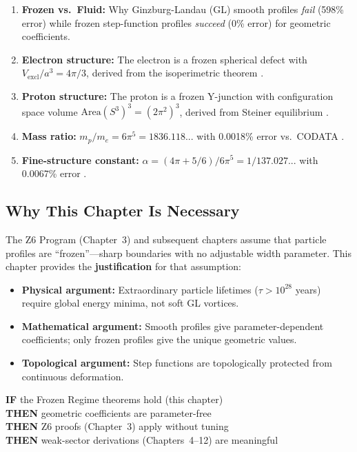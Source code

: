 \begin{enumerate}
    \item \textbf{Frozen vs.\ Fluid:} Why Ginzburg-Landau (GL) smooth profiles \emph{fail} (598\% error)
          while frozen step-function profiles \emph{succeed} (0\% error) for geometric coefficients.

    \item \textbf{Electron structure:} The electron is a frozen spherical defect with
          $V_{\text{excl}}/a^3 = 4\pi/3$, derived from the isoperimetric theorem \tagM{}.

    \item \textbf{Proton structure:} The proton is a frozen Y-junction with configuration space
          volume $\text{Area}(S^3)^3 = (2\pi^2)^3$, derived from Steiner equilibrium \tagM{}.

    \item \textbf{Mass ratio:} $m_p/m_e = 6\pi^5 = 1836.118...$ with 0.0018\% error vs.\ CODATA \tagDc{}.

    \item \textbf{Fine-structure constant:} $\alpha = (4\pi + 5/6)/6\pi^5 = 1/137.027...$
          with 0.0067\% error \tagDc{}.
\end{enumerate}

\subsection{Why This Chapter Is Necessary}

The Z6 Program (Chapter~3) and subsequent chapters assume that particle profiles are
``frozen''---sharp boundaries with no adjustable width parameter. This chapter provides
the \textbf{justification} for that assumption:

\begin{itemize}
    \item \textbf{Physical argument:} Extraordinary particle lifetimes ($\tau > 10^{28}$ years)
          require global energy minima, not soft GL vortices.
    \item \textbf{Mathematical argument:} Smooth profiles give parameter-dependent coefficients;
          only frozen profiles give the unique geometric values.
    \item \textbf{Topological argument:} Step functions are topologically protected from
          continuous deformation.
\end{itemize}

\begin{tcolorbox}[colback=yellow!5!white, colframe=yellow!50!black,
    title=\textbf{Dependency Map}]
\textbf{IF} the Frozen Regime theorems hold (this chapter) \\
\textbf{THEN} geometric coefficients are parameter-free \\
\textbf{THEN} Z6 proofs (Chapter~3) apply without tuning \\
\textbf{THEN} weak-sector derivations (Chapters~4--12) are meaningful
\end{tcolorbox}


